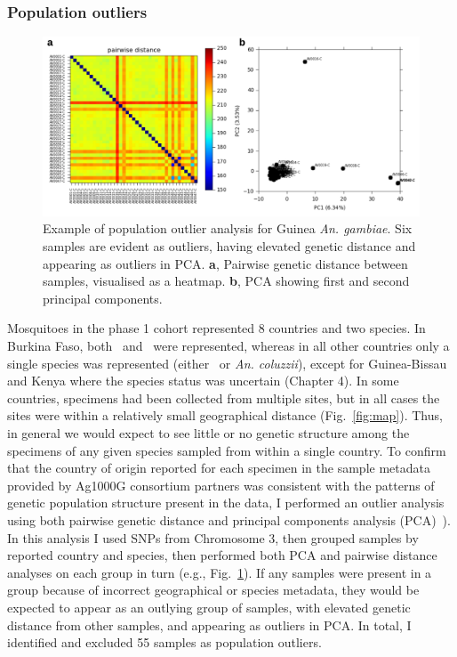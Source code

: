 \documentclass[a4paper,11pt,abstracton,hidelinks]{scrartcl}
\begin{document}
\subsubsection{Population outliers}


\begin{figure}[t!]
\centering
\includegraphics[width=\textwidth]{artwork/chapter3/popout.pdf}
\caption{Example of population outlier analysis for Guinea \textit{An. gambiae}.
%
Six samples are evident as outliers, having elevated genetic distance and appearing as outliers in PCA.
%
\textbf{a}, Pairwise genetic distance between samples, visualised as a heatmap.
%
\textbf{b}, PCA showing first and second principal components.
%
}
%
\label{fig:popout}
\end{figure}


Mosquitoes in the phase 1 cohort represented 8 countries and two species. 
%
In Burkina Faso, both \agam\ and \acol\ were represented, whereas in all other countries only a single species was represented (either \agam\ or \textit{An. coluzzii}), except for Guinea-Bissau and Kenya where the species status was uncertain (Chapter 4).
%
In some countries, specimens had been collected from multiple sites, but in all cases the sites were within a relatively small geographical distance (Fig.~\ref{fig:map}).
%
Thus, in general we would expect to see little or no genetic structure among the specimens of any given species sampled from within a single country.
%
To confirm that the country of origin reported for each specimen in the sample metadata provided by Ag1000G consortium partners was consistent with the patterns of genetic population structure present in the data, I performed an outlier analysis using both pairwise genetic distance and principal components analysis (PCA)~\parencite{Patterson2006}).
%
In this analysis I used SNPs from Chromosome 3, then grouped samples by reported country and species, then performed both PCA and pairwise distance analyses on each group in turn (e.g., Fig.~\ref{fig:popout}).
%
If any samples were present in a group because of incorrect geographical or species metadata, they would be expected to appear as an outlying group of samples, with elevated genetic distance from other samples, and appearing as outliers in PCA.
%
In total, I identified and excluded 55 samples as population outliers.
\end{document}
